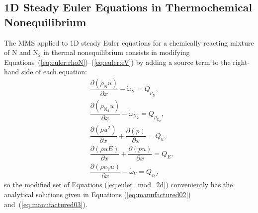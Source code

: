 \documentclass[10pt]{article}
\newcommand{\Diff}[2] {\dfrac{\partial( #1)}{\partial #2}}
\begin{document}

\subsection{1D Steady Euler Equations in Thermochemical Nonequilibrium}

The MMS applied to 1D steady Euler equations for a chemically reacting mixture of  N and N$_{2}$ in thermal nonequilibrium consists in modifying  Equations~(\ref{eq:euler:rhoN})--(\ref{eq:euler:eV}) by adding a source term to the right-hand side of each equation:
\begin{equation}
 \label{eq:euler_mod_2d}
\begin{split}
&\Diff{\rho_{\text{N}} u}{x} -\dot{\omega}_{\text{N}}= Q_{\rho_{\text{N}}},\\
&\Diff{\rho_{\text{N}_2} u}{x} -\dot{\omega}_{\text{N}_2}= Q_{\rho_{\text{N}_2}},\\
&\Diff{\rho u^2 }{x}+ \Diff{p}{x} = Q_u,\\
&\Diff{\rho uE}{x}+ \Diff{pu}{x} = Q_{E},\\
& \Diff{\rho e_V u }{x}-\dot{\omega}_V =Q_{e_V},
\end{split}
\end{equation}
%
so the modified set of Equations (\ref{eq:euler_mod_2d}) conveniently has the analytical solutions given in Equations (\ref{eq:manufactured02}) and~(\ref{eq:manufactured03}).
%
\end{document}
